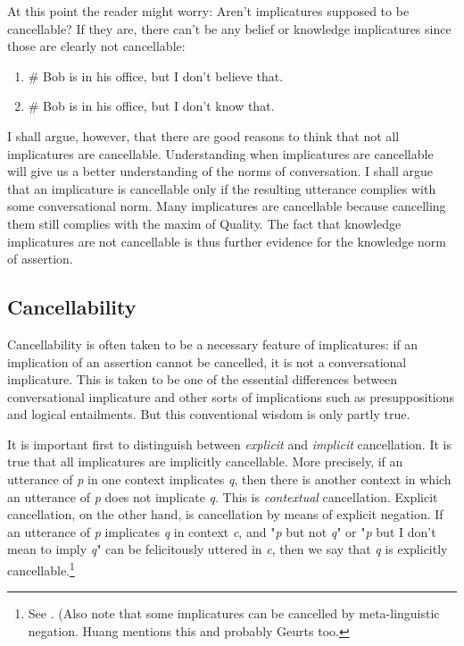 \documentclass[12pt]{article}
\begin{document}
At this point the reader might worry: Aren't implicatures supposed to be cancellable? If they are, there can't be any belief or knowledge implicatures since those are clearly not cancellable:

\begin{enumerate}[resume]
  \item
    \# Bob is in his office, but I don't believe that.
  \item
    \# Bob is in his office, but I don't know that.
\end{enumerate}
%
I shall argue, however, that there are good reasons to think that not all implicatures are cancellable. Understanding when implicatures are cancellable will give us a better understanding of the norms of conversation. I shall argue that an implicature is cancellable only if the resulting utterance complies with some conversational norm. Many implicatures are cancellable because cancelling them still complies with the maxim of Quality. The fact that knowledge implicatures are not cancellable is thus further evidence for the knowledge norm of assertion.

\subsection{Cancellability}

Cancellability is often taken to be a necessary feature of implicatures: if an implication of an assertion cannot be cancelled, it is not a conversational implicature. This is taken to be one of the essential differences between conversational implicature and other sorts of implications such as presuppositions and logical entailments. But this conventional wisdom is only partly true.

It is important first to distinguish between \textit{explicit} and \textit{implicit} cancellation. It is true that all implicatures are implicitly cancellable. More precisely, if an utterance of \textit{p} in one context implicates \textit{q}, then there is another context in which an utterance of \textit{p} does not implicate \textit{q}. This is \textit{contextual} cancellation. Explicit cancellation, on the other hand, is cancellation by means of explicit negation. If an utterance of \textit{p} implicates \textit{q} in context \textit{c}, and "\textit{p} but not \textit{q}" or "\textit{p} but I don't mean to imply \textit{q}" can be felicitously uttered in \textit{c}, then we say that \textit{q} is explicitly cancellable.\footnote{See \textcite{geurts_quantity_2010}. (Also note that some implicatures can be cancelled by meta-linguistic negation. Huang mentions this and probably Geurts too.}
\end{document}
